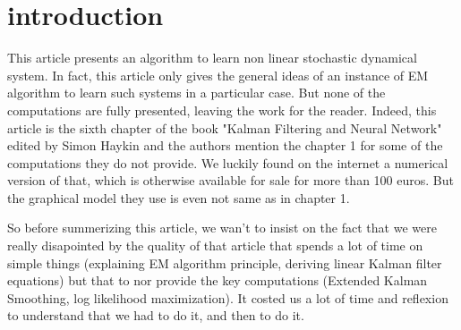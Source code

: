 \section*{introduction}

This article presents an algorithm to learn non linear stochastic dynamical system.
In fact, this article only gives the general ideas of an instance of EM algorithm to learn such systems in a particular case.
But none of the computations are fully presented, leaving the work for the reader.
Indeed, this article is the sixth chapter of the book "Kalman Filtering and Neural Network" edited by Simon Haykin and the authors mention the chapter 1 for some of the computations they do not provide.
We luckily found on the internet a numerical version of that, which is otherwise available for sale for more than 100 euros.
But the graphical model they use is even not same as in chapter 1.

So before summerizing this article, we wan't to insist on the fact that we were really disapointed by the quality of that article that spends a lot of time on simple things (explaining EM algorithm principle, deriving linear Kalman filter equations) but that to nor provide the key computations (Extended Kalman Smoothing, log likelihood maximization).
It costed us a lot of time and reflexion to understand that we had to do it, and then to do it.

